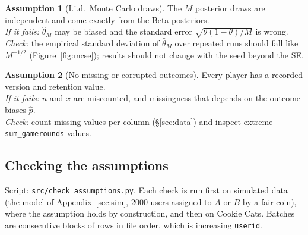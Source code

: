 \documentclass[11pt]{article}
\theoremstyle{definition}
\newtheorem{assumption}{Assumption}
\theoremstyle{remark}
\begin{document}
\begin{assumption}[I.i.d.\ Monte Carlo draws]\label{as:mc}
The $M$ posterior draws are independent and come exactly from the Beta posteriors.\\
\emph{If it fails:} $\hat\theta_M$ may be biased and the standard error $\sqrt{\theta(1-\theta)/M}$ is wrong.\\
\emph{Check:} the empirical standard deviation of $\hat\theta_M$ over repeated runs should fall like
$M^{-1/2}$ (Figure~\ref{fig:mcse}); results should not change with the seed beyond the SE.
\end{assumption}

\begin{assumption}[No missing or corrupted outcomes]\label{as:missing}
Every player has a recorded version and retention value.\\
\emph{If it fails:} $n$ and $x$ are miscounted, and missingness that depends on the outcome biases $\hat p$.\\
\emph{Check:} count missing values per column (\S\ref{sec:data}) and inspect extreme
\texttt{sum\_gamerounds} values.
\end{assumption}

\subsection{Checking the assumptions}\label{sec:it3-assump}

Script: \texttt{src/check\_assumptions.py}. Each check is run first on simulated data (the model of Appendix~\ref{sec:sim}, 2000
users assigned to $A$ or $B$ by a fair coin), where the assumption holds by construction, and then on Cookie Cats.
Batches are consecutive blocks of rows in file order, which is increasing \texttt{userid}.
\end{document}
